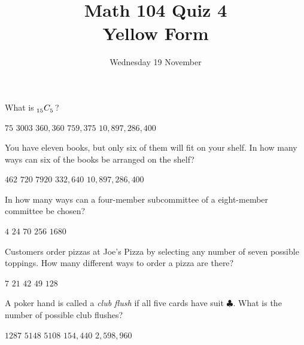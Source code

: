 \documentclass[answers,12pt]{exam}
\title{Math 104 Quiz 4\\Yellow Form}
\date{Wednesday 19 November}
\newcommand\ncr[2]{\tensor[_{#1}]C{_{#2}}}
\begin{document}
\maketitle
\begin{center}
\end{center}

\begin{questions}

\question What is $\ncr{15}{5}$?\\
\begin{oneparchoices}
\choice $75$ %
\correctchoice $3003$
\choice $360,360$ %
\choice $759,375$ %
\choice $10,897,286,400$ %
\end{oneparchoices}

\question You have eleven books, but only six
of them will fit on your shelf. In how many 
ways can six of the books be arranged on the shelf?\\
\begin{oneparchoices}
\choice $462$ %
\choice $720$ %
\choice $7920$ %
\correctchoice $332,640$
\choice $10,897,286,400$ %
\end{oneparchoices}

\question In how many ways can a four-member subcommittee
of a eight-member committee be chosen?\\
\begin{oneparchoices}
\choice $4$ %
\choice $24$ %
\correctchoice $70$
\choice $256$ %
\choice $1680$ %
\end{oneparchoices}

\question Customers order pizzas at Joe's Pizza
by selecting any number of seven possible toppings.
How many different ways to order a pizza are there?\\
\begin{oneparchoices}
\choice $7$ %
\choice $21$ %
\choice $42$ %
\choice $49$ %
\correctchoice $128$
\end{oneparchoices}

\question A poker hand is called a {\em club flush}
if all five cards have suit $\clubsuit$. What is
the number of possible club flushes?\\
\begin{oneparchoices}
\correctchoice $1287$
\choice $5148$ %
\choice $5108$ %
\choice $154,440$ %
\choice $2,598,960$ %
\end{oneparchoices}


\end{questions}
\end{document}
